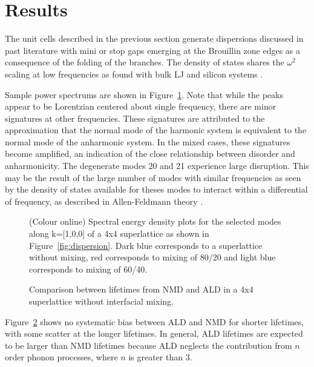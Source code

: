 \documentclass[aps,prb,preprint,preprintnumbers,amsmath,amssymb,floatfix,superscriptaddress]{revtex4}
\begin{document}
\section{Results}
The unit cells described in the previous section generate dispersions discussed in past literature \cite{} with mini or stop gaps emerging at the Brouillin zone edges as a consequence of the folding of the branches. The density of states shares the $\omega^2$ scaling at low frequencies as found with bulk LJ and silicon systems \cite{}. 
\renewcommand{\topfraction}{0.7}
\begin{figure*}[ht!]
\begin{center}
\renewcommand{\figure}{Fig.}
\caption{Dispersion of a 4x4 superlattice for modes normal to the interfaces. Red squares represent select modes for k=[1,0,0].}
\label{fig:dispersion}
\end{center}
\end{figure*}
Sample power spectrums are shown in Figure~\ref{fig:sed}. Note that while the peaks appear to be Lorentzian centered about single frequency, there are minor signatures at other frequencies. These signatures are attributed to the approximation that the normal mode of the harmonic system is equivalent to the normal mode of the anharmonic system. In the mixed cases, these signatures become amplified, an indication of the close relationship between disorder and anharmonicity\cite{}. The degenerate modes 20 and 21 experience large disruption. This may be the result of the large number of modes with similar frequencies as seen by the density of states available for theses modes to interact within a differential of frequency, as described in Allen-Feldmann theory \cite{}.
\begin{figure}[!h]
\begin{center}
\renewcommand{\figure}{Fig.}
\caption{(Colour online) Spectral energy density plots for the selected modes along k=[1,0,0] of a 4x4 superlattice as shown in Figure~\ref{fig:dispersion}. Dark blue corresponds to a superlattice without mixing, red corresponds to mixing of 80/20 and light blue corresponds to mixing of 60/40.}
\label{fig:sed}
\end{center}
\end{figure}
\begin{figure}%
\begin{center}
\renewcommand{\figure}{Fig.}
\caption{Comparison between lifetimes from NMD and ALD in a 4x4 superlattice without interfacial mixing.}
\label{FIG:NMD_v_ALD}
\end{center}
\end{figure}
Figure~\ref{FIG:NMD_v_ALD} shows no systematic bias between ALD and NMD for shorter lifetimes, with some scatter at the longer lifetimes. In general, ALD lifetimes are expected to be larger than NMD lifetimes because ALD neglects the contribution from $n$ order phonon processes, where $n$ is greater than 3. 
\end{document}
